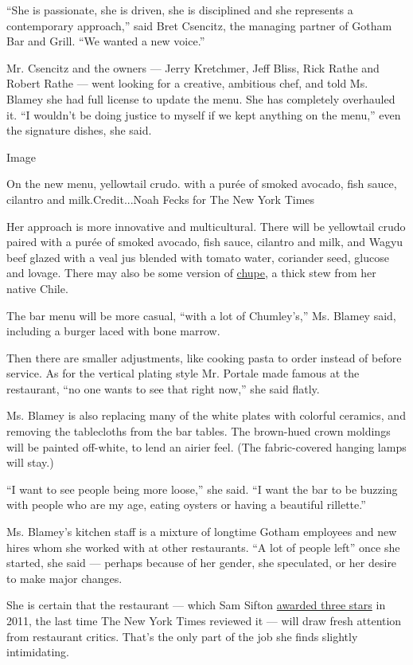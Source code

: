 ``She is passionate, she is driven, she is disciplined and she
represents a contemporary approach,'' said Bret Csencitz, the managing
partner of Gotham Bar and Grill. ``We wanted a new voice.''

Mr. Csencitz and the owners --- Jerry Kretchmer, Jeff Bliss, Rick Rathe
and Robert Rathe --- went looking for a creative, ambitious chef, and
told Ms. Blamey she had full license to update the menu. She has
completely overhauled it. ``I wouldn't be doing justice to myself if we
kept anything on the menu,'' even the signature dishes, she said.

Image

On the new menu, yellowtail crudo. with a purée of smoked avocado, fish
sauce, cilantro and milk.Credit...Noah Fecks for The New York Times

Her approach is more innovative and multicultural. There will be
yellowtail crudo paired with a purée of smoked avocado, fish sauce,
cilantro and milk, and Wagyu beef glazed with a veal jus blended with
tomato water, coriander seed, glucose and lovage. There may also be some
version of
\href{https://cooking.nytimes3xbfgragh.onion/recipes/1013220-corn-and-seafood-chupe}{chupe},
a thick stew from her native Chile.

The bar menu will be more casual, ``with a lot of Chumley's,'' Ms.
Blamey said, including a burger laced with bone marrow.

Then there are smaller adjustments, like cooking pasta to order instead
of before service. As for the vertical plating style Mr. Portale made
famous at the restaurant, ``no one wants to see that right now,'' she
said flatly.

Ms. Blamey is also replacing many of the white plates with colorful
ceramics, and removing the tablecloths from the bar tables. The
brown-hued crown moldings will be painted off-white, to lend an airier
feel. (The fabric-covered hanging lamps will stay.)

``I want to see people being more loose,'' she said. ``I want the bar to
be buzzing with people who are my age, eating oysters or having a
beautiful rillette.''

Ms. Blamey's kitchen staff is a mixture of longtime Gotham employees and
new hires whom she worked with at other restaurants. ``A lot of people
left'' once she started, she said --- perhaps because of her gender, she
speculated, or her desire to make major changes.

She is certain that the restaurant --- which Sam Sifton
\href{https://www.nytimes3xbfgragh.onion/2011/05/18/dining/reviews/gotham-bar-and-grill-nyc-restaurant-review.html}{awarded
three stars} in 2011, the last time The New York Times reviewed it ---
will draw fresh attention from restaurant critics. That's the only part
of the job she finds slightly intimidating.

